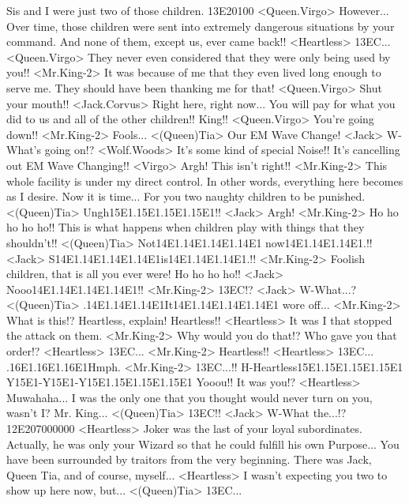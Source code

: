 Sis and I were just two of those children. 
{13}{E2}{01}{00} 
<Queen.Virgo> However... Over time, those children were sent into extremely 
dangerous situations by your command. 
And none of them, except us, ever came back!! 
<Heartless> {13}{EC}... 
<Queen.Virgo> They never even considered that they were only being used by you!! 
<Mr.King-2> It was because of me that they even lived long enough to serve me. 
They should have been thanking me for that! 
<Queen.Virgo> Shut your mouth!! 
<Jack.Corvus> Right here, right now... 
You will pay for what you did to us and all of the other children!! 
King!! 
<Queen.Virgo> You're going down!! 
<Mr.King-2> Fools... 
<(Queen)Tia> Our EM Wave Change! 
<Jack> W-What's going on!? 
<Wolf.Woods> It's some kind of special Noise!! It's cancelling out EM Wave Changing!! 
<Virgo> Argh! This isn't right!! 
<Mr.King-2> This whole facility is under my direct control. 
In other words, everything here becomes as I desire. 
Now it is time... 
For you two naughty children to be punished. 
<(Queen)Tia> Ungh{15}{E1}.{15}{E1}.{15}{E1}.{15}{E1}!! 
<Jack> Argh! 
<Mr.King-2> Ho ho ho ho ho!! 
This is what happens when children play with things that they shouldn't!! 
<(Queen)Tia> Not{14}{E1}.{14}{E1}.{14}{E1}.{14}{E1} now{14}{E1}.{14}{E1}.{14}{E1}.!! 
<Jack> S{14}{E1}.{14}{E1}.{14}{E1}.{14}{E1}is{14}{E1}.{14}{E1}.{14}{E1}.!! 
<Mr.King-2> Foolish children, that is all you ever were! Ho ho ho ho!! 
<Jack> Nooo{14}{E1}.{14}{E1}.{14}{E1}.{14}{E1}!! 
<Mr.King-2> {13}{EC}!? 
<Jack> W-What...? 
<(Queen)Tia> .{14}{E1}.{14}{E1}.{14}{E1}It{14}{E1}.{14}{E1}.{14}{E1}.{14}{E1} wore off... 
<Mr.King-2> What is this!? 
Heartless, explain! 
Heartless!! 
<Heartless> It was I that stopped the attack on them. 
<Mr.King-2> Why would you do that!? 
Who gave you that order!? 
<Heartless> {13}{EC}... 
<Mr.King-2> Heartless!! 
<Heartless> {13}{EC}... 
.{16}{E1}.{16}{E1}.{16}{E1}Hmph. 
<Mr.King-2> {13}{EC}...!! 
H-Heartless{15}{E1}.{15}{E1}.{15}{E1}.{15}{E1} 
Y{15}{E1}-Y{15}{E1}-Y{15}{E1}.{15}{E1}.{15}{E1}.{15}{E1} 
Yooou!! 
It was you!? 
<Heartless> Muwahaha... 
I was the only one that you thought would never turn on you, wasn't I? 
Mr. King... 
<(Queen)Tia> {13}{EC}!! 
<Jack> W-What the...!? 
{12}{E2}{07}{00}{00}{00} 
<Heartless> Joker was the last of your loyal subordinates. 
Actually, he was only your Wizard so that he could fulfill his own Purpose... 
You have been surrounded by traitors from the very beginning. 
There was Jack, Queen Tia, and of course, myself... 
<Heartless> I wasn't expecting you two to show up here now, but... 
<(Queen)Tia> {13}{EC}... 
